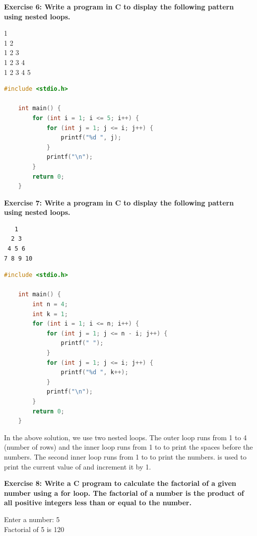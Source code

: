 \documentclass[12pt, openany]{book}
\begin{document}
\noindent\textbf{Exercise 6: Write a program in C to display the following pattern using nested loops.}
\begin{tcolorbox}[colback=lightgray!10, colframe=black, title=Example Output]
    1 \\
    1 2 \\
    1 2 3 \\
    1 2 3 4 \\
    1 2 3 4 5
\end{tcolorbox}

\begin{lstlisting}[language=C, gobble=0, caption=Solution to Exercise 6]
    #include <stdio.h>
    
    int main() {
        for (int i = 1; i <= 5; i++) {
            for (int j = 1; j <= i; j++) {
                printf("%d ", j);
            }
            printf("\n");
        }
        return 0;
    }
\end{lstlisting}

\noindent\textbf{Exercise 7: Write a program in C to display the following pattern using nested loops.}
\begin{tcolorbox}[colback=lightgray!10, colframe=black, title=Example Output]
\begin{verbatim}
   1
  2 3
 4 5 6
7 8 9 10
\end{verbatim}
\end{tcolorbox}

\begin{lstlisting}[language=C, gobble=0, caption=Solution to Exercise 7]
    #include <stdio.h>
    
    int main() {
        int n = 4;
        int k = 1;
        for (int i = 1; i <= n; i++) {
            for (int j = 1; j <= n - i; j++) {
                printf(" ");
            }
            for (int j = 1; j <= i; j++) {
                printf("%d ", k++);
            }
            printf("\n");
        }
        return 0;
    }
\end{lstlisting}

\begin{infobox}
    In the above solution, we use two nested loops. The outer loop runs from 1 to 4 (number of rows) and the inner loop runs from 1 to  to print the spaces before the numbers. The second inner loop runs from 1 to  to print the numbers.  is used to print the current value of  and increment it by 1.
\end{infobox}

\noindent\textbf{Exercise 8: Write a C program to calculate the factorial of a given number using a for loop. The factorial of a number is the product of all positive integers less than or equal to the number.}
\begin{tcolorbox}[colback=lightgray!10, colframe=black, title=Example Output]
    Enter a number: 5 \\
    Factorial of 5 is 120
\end{tcolorbox}
\end{document}
